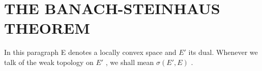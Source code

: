 \section{THE BANACH-STEINHAUS THEOREM}

In this paragraph E denotes a locally convex space and \(E'\) its dual. Whenever we talk of the weak topology on \(E'\) , we shall mean \(\sigma(E', E)\) .

